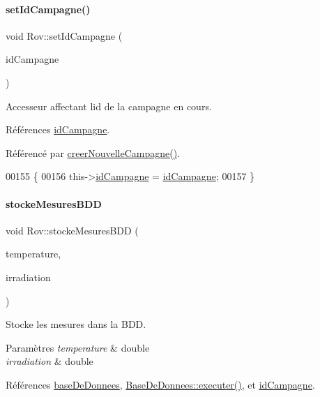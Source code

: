 \paragraph{\texorpdfstring{set\+Id\+Campagne()}{setIdCampagne()}}
{\footnotesize\ttfamily void Rov\+::set\+Id\+Campagne (\begin{DoxyParamCaption}\item[{Q\+String}]{id\+Campagne }\end{DoxyParamCaption})}

Accesseur affectant l\textquotesingle{}id de la campagne en cours. 

Références \hyperlink{class_rov_aaaed58cd7ee9edbeab5251cd413a1bae}{id\+Campagne}.



Référencé par \hyperlink{class_rov_ae1306036b067e9ad50a09f9dd607a092}{creer\+Nouvelle\+Campagne()}.


\begin{DoxyCode}
00155 \{
00156     this->\hyperlink{class_rov_aaaed58cd7ee9edbeab5251cd413a1bae}{idCampagne} = \hyperlink{class_rov_aaaed58cd7ee9edbeab5251cd413a1bae}{idCampagne};
00157 \}
\end{DoxyCode}
\mbox{\label{class_rov_adab08abfde381c2915695489b34da6b4}} 
\paragraph{\texorpdfstring{stocke\+Mesures\+B\+DD}{stockeMesuresBDD}}
{\footnotesize\ttfamily void Rov\+::stocke\+Mesures\+B\+DD (\begin{DoxyParamCaption}\item[{double}]{temperature,  }\item[{double}]{irradiation }\end{DoxyParamCaption})\hspace{0.3cm}{\ttfamily [slot]}}

Stocke les mesures dans la B\+DD.


\begin{DoxyParams}{Paramètres}
{\em temperature} & double \\
\hline
{\em irradiation} & double \\
\hline
\end{DoxyParams}


Références \hyperlink{class_rov_a5a9a824cd100947c75d0951eb9e1f90c}{base\+De\+Donnees}, \hyperlink{class_base_de_donnees_aa8de5f8f8bb17edc43f5c0ee33712081}{Base\+De\+Donnees\+::executer()}, et \hyperlink{class_rov_aaaed58cd7ee9edbeab5251cd413a1bae}{id\+Campagne}.



